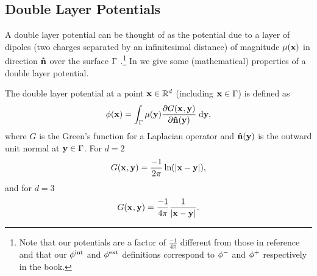 \subsection{Double Layer Potentials}
\label{sec:double-layer-potent}

A double layer potential can be thought of as the potential due to a layer of dipoles (\ie two charges separated by an infinitesimal distance) of magnitude $\mu(\boldsymbol{\mathrm{x}})$ in direction $\boldsymbol{\mathrm{\hat{n}}}$ over the surface ${\Gamma}$ \cite{Sternberg1946}.\footnote{Note that our potentials are a factor of $\frac{-1}{4 \pi}$ different from those in reference \cite{Sternberg1946} and that our $\phi^{\mathrm{int}}$ and $\phi^{\mathrm{ext}}$ definitions correspond to $\phi^-$ and $\phi^+$ respectively in the book.}
In  we give some (mathematical) properties of a double layer potential.

The double layer potential at a point $\boldsymbol{\mathrm{x}} \in \mathbb{R}^d$ (including $\boldsymbol{\mathrm{x}} \in {\Gamma}$) is defined as
\begin{equation}
  \label{eq:3}
  \phi(\boldsymbol{\mathrm{x}}) = \int_{{\Gamma}} \mu(\boldsymbol{\mathrm{y}}) \frac{\partial G(\boldsymbol{\mathrm{x}}_{},\boldsymbol{\mathrm{y}})}{\partial \boldsymbol{\mathrm{\hat{n}}}(\boldsymbol{\mathrm{y}})} {\; \mathrm{{d}}} \boldsymbol{\mathrm{y}},
\end{equation}
where $G$ is the Green's function for a Laplacian operator and $\boldsymbol{\mathrm{\hat{n}}}(\boldsymbol{\mathrm{y}})$ is the outward unit normal at $\boldsymbol{\mathrm{y}} \in {\Gamma}$.
For $d=2$
\begin{equation}
  G(\boldsymbol{\mathrm{x}}_{},\boldsymbol{\mathrm{y}}) = \dfrac{-1}{2\pi}\ln(\left|{\boldsymbol{\mathrm{x}} - \boldsymbol{\mathrm{y}}} \right|),
  \label{eqn:greenslaplacian2d}
\end{equation}
and for $d=3$
\begin{equation}
  G(\boldsymbol{\mathrm{x}}_{},\boldsymbol{\mathrm{y}}) = \dfrac{-1}{4 \pi} \dfrac{1}{\left|{\boldsymbol{\mathrm{x}} - \boldsymbol{\mathrm{y}}} \right|}.
  \label{eqn:greenslaplacian3d}
\end{equation}


